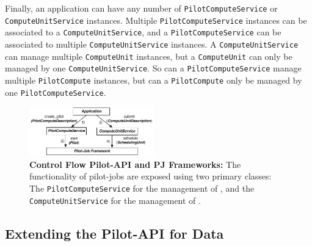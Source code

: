 \documentclass[conference]{IEEEtran}
\begin{document}
Finally, an application can have any number of \texttt{Pilot\-Compute\-Service} or
\texttt{Compute\-Unit\-Service} instances.
Multiple \texttt{Pilot\-Compute\-Service} instances can be associated to a
\texttt{Compute\-Unit\-Service}, and a \texttt{Pilot\-Compute\-Service} can be associated to
multiple \texttt{Compute\-Unit\-Service} instances.
A \texttt{Compute\-Unit\-Service} can manage multiple \texttt{Compute\-Unit}
instances, but a \texttt{Compute\-Unit} can only be managed by one
\texttt{Compute\-Unit\-Service}.
So can a \texttt{Pilot\-Compute\-Service} manage multiple
\texttt{Pilot\-Compute} instances, but can a \texttt{Pilot\-Compute} only be
managed by one \texttt{Pilot\-Compute\-Service}.


\begin{figure}[t]
	\centering
  \upp
		\includegraphics[width=0.48\textwidth]{../figures/pilot-api-flow.pdf}
	\caption{\textbf{Control Flow Pilot-API and PJ Frameworks:} The 
	functionality of pilot-jobs are exposed using two primary classes: The 
	\texttt{Pilot\-Compute\-Service} for the management 
	of \pilots, and the \texttt{Compute\-Unit\-Service} for the management of 
	\cus. \upp
	}
	\label{fig:figures_pilot_api_flow}
\end{figure}




\subsection{Extending the Pilot-API for Data} 
\end{document}
